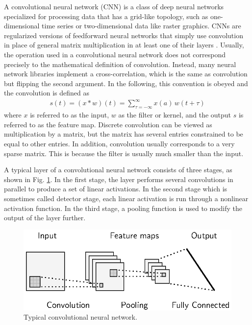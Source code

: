 \documentclass{scrartcl}
\begin{document}
A convolutional neural network (CNN) \cite{LeCun1989} is a class of deep neural networks specialized for processing data that has a grid-like topology, such as one-dimensional time series or two-dimensional data like raster graphics. CNNs are regularized versions of feedforward neural networks that simply use convolution in place of general matrix multiplication in at least one of their layers \cite{Goodfellow2016}. Usually, the operation used in a convolutional neural network does not correspond precisely to the mathematical definition of convolution. Instead, many neural network libraries implement a cross-correlation, which is the same as convolution but flipping the second argument. In the following, this convention is obeyed and the convolution is defined as
\begin{align}
s(t) = (x * w)(t) = \sum_{\tau=-\infty}^{\infty} x(a)\,w(t+\tau)
\end{align} 
where $x$ is referred to as the input, $w$ as the filter or kernel, and the output $s$ is referred to as the feature map. Discrete convolution can be viewed as multiplication by a matrix, but the matrix has several entries constrained to be equal to other entries. In addition, convolution usually corresponds to a very sparse matrix. This is because the filter is usually much smaller than the input. 

A typical layer of a convolutional neural network consists of three stages, as shown in Fig. \ref{fig:typical_cnn}. In the first stage, the layer performs several convolutions in parallel to produce a set of linear activations. In the second stage which is sometimes called detector stage, each linear activation is run through a nonlinear activation function. In the third stage, a pooling function is used to modify the output of the layer further. 

\begin{figure}[htbp]
\centering
\includegraphics[scale=1]{figures/cnn.eps}
\caption{Typical convolutional neural network. }
\label{fig:typical_cnn}
\end{figure}
\end{document}
